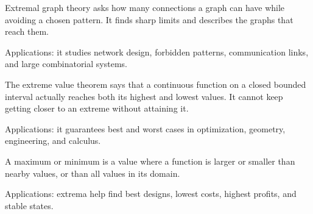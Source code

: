 Extremal graph theory asks how many connections a graph can have while avoiding a chosen pattern. It finds sharp limits and describes the graphs that reach them. \par\noindent Applications: it studies network design, forbidden patterns, communication links, and large combinatorial systems.

The extreme value theorem says that a continuous function on a closed bounded interval actually reaches both its highest and lowest values. It cannot keep getting closer to an extreme without attaining it. \par\noindent Applications: it guarantees best and worst cases in optimization, geometry, engineering, and calculus.

A maximum or minimum is a value where a function is larger or smaller than nearby values, or than all values in its domain. \par\noindent Applications: extrema help find best designs, lowest costs, highest profits, and stable states.
